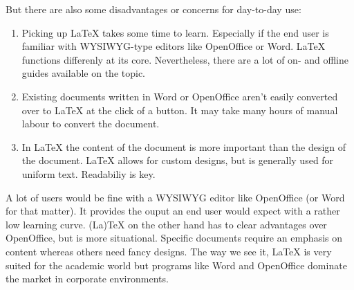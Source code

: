 But there are also some disadvantages or concerns for day-to-day use:
\begin{enumerate}
	\item Picking up LaTeX takes some time to learn. Especially if the end user is familiar with WYSIWYG-type editors like OpenOffice or Word. LaTeX functions differenly at its core. Nevertheless, there are a lot of on- and offline guides available on the topic.
	\item Existing documents written in Word or OpenOffice aren't easily converted over to LaTeX at the click of a button. It may take many hours of manual labour to convert the document.
	\item In LaTeX the content of the document is more important than the design of the document. LaTeX allows for custom designs, but is generally used for uniform text. Readabiliy is key.
\end{enumerate}

A lot of users would be fine with a WYSIWYG editor like OpenOffice (or Word for that matter). It provides the ouput an end user would expect with a rather low learning curve. (La)TeX on the other hand has to clear advantages over OpenOffice, but is more situational. Specific documents require an emphasis on content whereas others need fancy designs. The way we see it, LaTeX is very suited for the academic world but programs like Word and OpenOffice dominate the market in corporate environments.
